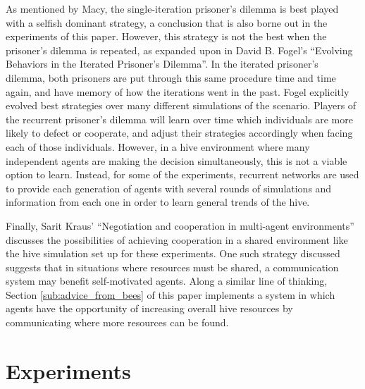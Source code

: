 \documentclass[twoside]{article}
\begin{document}
\begin{multicols}{2}
	As mentioned by Macy, the single-iteration prisoner's dilemma is best played with a selfish dominant strategy, a conclusion that is also borne out in the experiments of this paper. However, this strategy is not the best when the prisoner's dilemma is repeated, as expanded upon in David B. Fogel's ``Evolving Behaviors in the Iterated Prisoner's Dilemma''. \cite{fogel} In the iterated prisoner's dilemma, both prisoners are put through this same procedure time and time again, and have memory of how the iterations went in the past. Fogel explicitly evolved best strategies over many different simulations of the scenario. Players of the recurrent prisoner's dilemma will learn over time which individuals are more likely to defect or cooperate, and adjust their strategies accordingly when facing each of those individuals. However, in a hive environment where many independent agents are making the decision simultaneously, this is not a viable option to learn. Instead, for some of the experiments, recurrent networks are used to provide each generation of agents with several rounds of simulations and information from each one in order to learn general trends of the hive.

	Finally, Sarit Kraus' ``Negotiation and cooperation in multi-agent environments'' discusses the possibilities of achieving cooperation in a shared environment like the hive simulation set up for these experiments. \cite{kraus} One such strategy discussed suggests that in situations where resources must be shared, a communication system may benefit self-motivated agents. Along a similar line of thinking, Section \ref{sub:advice_from_bees} of this paper implements a system in which agents have the opportunity of increasing overall hive resources by communicating where more resources can be found. 



	\section{Experiments} %
	\label{sec:experiments}


\end{multicols}
\end{document}
